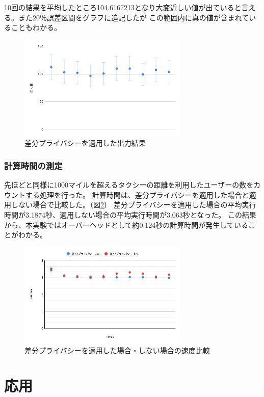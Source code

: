 \documentclass[a4paper,11pt]{jreport}
\begin{document}
10回の結果を平均したところ104.6167213となり大変近しい値が出ていると言える。また20％誤差区間をグラフに追記したが
この範囲内に真の値が含まれていることもわかる。

\begin{figure}[htbp]
    \centering
\includegraphics[height=50mm]{noise.png}
    \caption{差分プライバシーを適用した出力結果}
    \label{fig:noise}
\end{figure}

\subsection{計算時間の測定}

先ほどと同様に1000マイルを超えるタクシーの距離を利用したユーザーの数をカウントする処理を行った。
計算時間は、差分プライバシーを適用した場合と適用しない場合で比較した。（図\ref{fig:time}）
差分プライバシーを適用した場合の平均実行時間が3.1874秒、適用しない場合の平均実行時間が3.063秒となった。
この結果から、本実験ではオーバーヘッドとして約0.124秒の計算時間が発生していることがわかる。

\begin{figure}[htbp]
    \centering
\includegraphics[height=50mm]{time.png}
    \caption{差分プライバシーを適用した場合・しない場合の速度比較}
    \label{fig:time}
\end{figure}

\chapter{応用}
\end{document}
